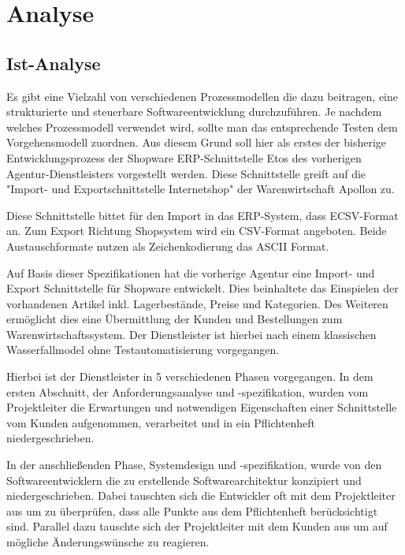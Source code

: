 \newpage
\section{Analyse}

\subsection{Ist-Analyse}
Es gibt eine Vielzahl von verschiedenen Prozessmodellen die dazu beitragen, eine strukturierte und
steuerbare Softwareentwicklung durchzuführen. Je nachdem welches Prozessmodell verwendet wird,
sollte man das entsprechende Testen dem Vorgehensmodell zuordnen. Aus diesem Grund soll hier
als erstes der bisherige Entwicklungsprozess der  Shopware ERP-Schnittstelle Etos des vorherigen Agentur-Dienstleisters vorgestellt werden. Diese Schnittstelle greift auf die "Import- und Exportschnittstelle Internetshop" der Warenwirtschaft Apollon zu. 

Diese Schnittstelle bittet für den Import in das ERP-System, dass ECSV-Format an. Zum Export Richtung Shopsystem wird ein CSV-Format angeboten. Beide Austauschformate nutzen als Zeichenkodierung das ASCII Format.

Auf Basis dieser Spezifikationen hat die vorherige Agentur eine Import- und Export Schnittstelle für Shopware entwickelt. Dies beinhaltete das Einspielen der vorhandenen Artikel inkl. Lagerbestände, Preise und Kategorien. Des Weiteren ermöglicht dies eine Übermittlung der Kunden und Bestellungen zum Warenwirtschaftssystem. Der Dienstleister ist hierbei nach einem klassischen Wasserfallmodel ohne Testautomatisierung vorgegangen. 

Hierbei ist der Dienstleister in 5 verschiedenen Phasen vorgegangen. In dem ersten Abschnitt, der Anforderungsanalyse und -spezifikation, wurden vom Projektleiter die Erwartungen und notwendigen Eigenschaften einer Schnittstelle vom Kunden aufgenommen, verarbeitet und in ein Pflichtenheft niedergeschrieben.

In der anschließenden Phase, Systemdesign und -spezifikation, wurde von den Softwareentwicklern die zu erstellende Softwarearchitektur konzipiert und niedergeschrieben. Dabei tauschten sich die Entwickler oft mit dem Projektleiter aus um zu überprüfen, dass alle Punkte aus dem Pflichtenheft berücksichtigt sind. Parallel dazu tauschte sich der Projektleiter mit dem Kunden aus um auf mögliche Änderungswünsche zu reagieren.

